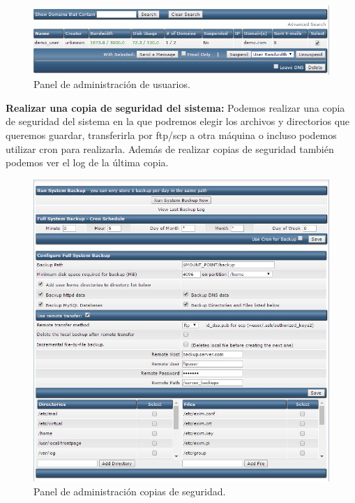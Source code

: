 \begin{figure}[H]
	\centering
	\includegraphics[scale=0.75]{ban-user.jpg}
	\caption{Panel de administración de usuarios. \label{fig:figura8}}
\end{figure}

\newpage

\textbf{Realizar una copia de seguridad del sistema:} Podemos realizar una copia de seguridad del sistema en la que podremos elegir los archivos y directorios que queremos guardar, transferirla por ftp/scp a otra máquina o incluso podemos utilizar cron para realizarla. Además de realizar copias de seguridad también podemos ver el log de la última copia.

\begin{figure}[H]
	\centering
	\includegraphics[scale=0.75]{backup.jpg}
	\caption{Panel de administración copias de seguridad. \label{fig:figura9}}
\end{figure}

